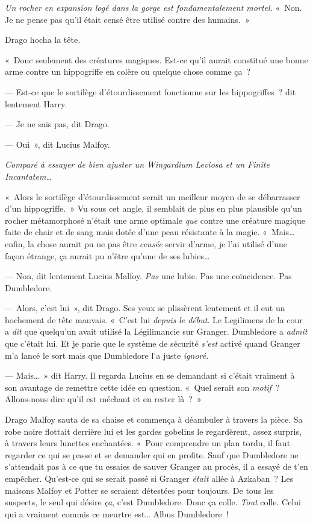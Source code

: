\emph{Un rocher en expansion logé dans la gorge est fondamentalement mortel.} «~Non.
Je ne pense pas qu'il était censé être utilisé contre des humains.~»

Drago hocha la tête.

«~Donc seulement des créatures magiques.
Est-ce qu'il aurait constitué une bonne arme contre un hippogriffe en colère ou quelque chose comme ça~?

--- Est-ce que le sortilège d'étourdissement fonctionne sur les hippogriffes~? dit lentement Harry.

--- Je ne sais pas, dit Drago.

--- Oui~», dit Lucius Malfoy.

\emph{Comparé à essayer de bien ajuster un Wingardium Leviosa et un Finite Incantatem…}

«~Alors le sortilège d'étourdissement serait un meilleur moyen de se débarrasser d'un hippogriffe.~»
Vu sous cet angle, il semblait de plus en plus plausible qu'un rocher métamorphosé n'était une arme optimale \emph{que} contre une créature magique faite de chair et de sang mais dotée d'une peau résistante à la magie.
«~Mais… enfin, la chose aurait pu ne pas être \emph{censée} servir d'arme, je l'ai utilisé d'une façon étrange, ça aurait pu n'être qu'une de ses lubies…

--- Non, dit lentement Lucius Malfoy.
\emph{Pas} une lubie.
Pas une coïncidence.
Pas Dumbledore.

--- Alors, c'est lui~», dit Drago.
Ses yeux se plissèrent lentement et il eut un hochement de tête mauvais.
«~C'est lui \emph{depuis le début}.
Le Legilimens de la cour a \emph{dit} que quelqu'un avait utilisé la Légilimancie sur Granger.
Dumbledore a \emph{admit} que c'était lui.
Et je parie que le système de sécurité \emph{s'est} activé quand Granger m'a lancé le sort mais que Dumbledore l'a juste \emph{ignoré}.

--- Mais…~»
dit Harry.
Il regarda Lucius en se demandant si c'était vraiment à son avantage de remettre cette idée en question.
«~Quel serait son \emph{motif}~?
Allons-nous dire qu'il est méchant et en rester là~?~»

Drago Malfoy sauta de sa chaise et commença à déambuler à travers la pièce.
Sa robe noire flottait derrière lui et les gardes gobelins le regardèrent, assez surpris, à travers leurs lunettes enchantées.
«~Pour comprendre un plan tordu, il faut regarder ce qui se passe et se demander qui en profite.
Sauf que Dumbledore ne s'attendait pas à ce que tu essaies de sauver Granger au procès, il a essayé de t'en empêcher.
Qu'est-ce qui se serait passé si Granger \emph{était} allée à Azkaban~?
Les maisons Malfoy et Potter se seraient détestées pour toujours.
De tous les suspects, le seul qui désire \emph{ça}, c'est Dumbledore.
Donc ça colle.
\emph{Tout} colle.
Celui qui a vraiment commis ce meurtre est…
Albus Dumbledore~!

